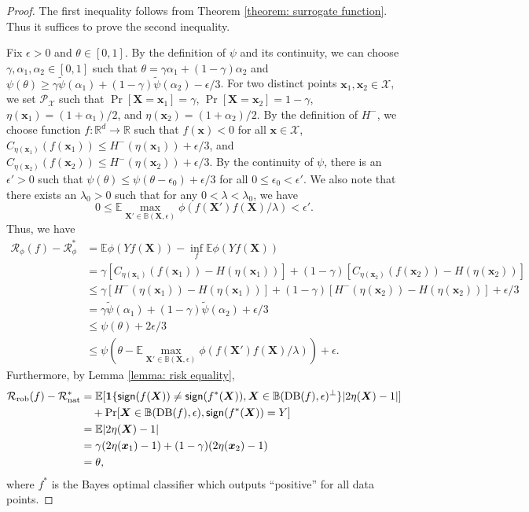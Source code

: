\documentclass[11pt]{article}
\newcommand{\sign}{\textup{\textsf{sign}}}
\newcommand{\adv}{\mathrm{rob}}
\newcommand{\nat}{\mathrm{nat}}
\newcommand{\boundary}{\mathrm{DB}}
\newcommand{\x}{\bm{x}}
\newcommand{\R}{\mathbb{R}}
\newcommand{\X}{\bm{X}}
\newcommand{\0}{\mathbf{0}}
\newcommand{\1}{\mathbf{1}}
\newcommand{\cP}{\mathcal{P}}
\newcommand{\cR}{\mathcal{R}}
\newcommand{\cX}{\mathcal{X}}
\newcommand{\bbB}{\mathbb{B}}
\newcommand{\bbE}{\mathbb{E}}
\begin{document}
\begin{proof}
The first inequality follows from Theorem \ref{theorem: surrogate function}. Thus it suffices to prove the second inequality.

Fix $\epsilon>0$ and $\theta\in[0,1]$. By the definition of $\psi$ and its continuity, we can choose $\gamma,\alpha_1,\alpha_2\in[0,1]$ such that $\theta=\gamma\alpha_1+(1-\gamma)\alpha_2$ and $\psi(\theta)\ge \gamma\tilde{\psi}(\alpha_1)+(1-\gamma)\tilde{\psi}(\alpha_2)-\epsilon/3$. For two distinct points $\x_1,\x_2\in \cX$, we set $\cP_\cX$ such that $\Pr[\X=\x_1]=\gamma$, $\Pr[\X=\x_2]=1-\gamma$, $\eta(\x_1)=(1+\alpha_1)/2$, and $\eta(\x_2)=(1+\alpha_2)/2$. By the definition of $H^-$, we choose function $f:\R^d\rightarrow\R$ such that $f(\x)< 0$ for all $\x\in\cX$, $C_{\eta(\x_1)}(f(\x_1))\le H^-(\eta(\x_1))+\epsilon/3$, and $C_{\eta(\x_2)}(f(\x_2))\le H^-(\eta(\x_2))+\epsilon/3$. By the continuity of $\psi$, there is an $\epsilon'>0$ such that $\psi(\theta)\le \psi(\theta-\epsilon_0)+\epsilon/3$ for all $0\le \epsilon_0<\epsilon'$. We also note that there exists an $\lambda_0>0$ such that for any $0<\lambda<\lambda_0$, we have
\begin{equation*}
0\le \bbE \max_{\X'\in\bbB(\X,\epsilon)}\phi(f(\X')f(\X)/\lambda)<\epsilon'.
\end{equation*}
Thus, we have
\begin{equation*}
\begin{split}
\cR_\phi(f)-\cR_\phi^*&=\bbE\phi(Yf(\X))-\inf_f \bbE\phi(Yf(\X))\\
&=\gamma [C_{\eta(\x_1)}(f(\x_1))-H(\eta(\x_1))]+(1-\gamma)[C_{\eta(\x_2)}(f(\x_2))-H(\eta(\x_2))]\\
&\le \gamma [H^-(\eta(\x_1))-H(\eta(\x_1))]+(1-\gamma)[H^-(\eta(\x_2))-H(\eta(\x_2))]+\epsilon/3\\
&=\gamma \tilde\psi(\alpha_1)+(1-\gamma)\tilde{\psi}(\alpha_2)+\epsilon/3\\
&\le \psi(\theta)+2\epsilon/3\\
&\le \psi\left(\theta-\bbE \max_{\X'\in\bbB(\X,\epsilon)}\phi(f(\X')f(\X)/\lambda)\right)+\epsilon.
\end{split}
\end{equation*}
Furthermore, by Lemma \ref{lemma: risk equality},
\begin{equation*}
\begin{split}
\cR_\adv(f)-\cR_\nat^*&=\bbE[\1\{\sign(f(\X))\not=\sign(f^*(\X)),\X\in\bbB(\boundary(f),\epsilon)^\perp\}|2\eta(\X)-1|]\\
&\quad +\Pr[\X\in \bbB(\boundary(f),\epsilon),\sign(f^*(\X))=Y]\\
&=\bbE|2\eta(\X)-1|\\
&=\gamma (2\eta(\x_1)-1)+(1-\gamma)(2\eta(\x_2)-1)\\
&=\theta,
\end{split}
\end{equation*}
where $f^*$ is the Bayes optimal classifier which outputs ``positive'' for all data points.
\end{proof}
\end{document}

